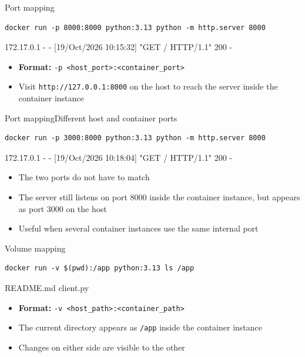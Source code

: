 \documentclass[aspectratio=169]{beamer}
\begin{document}
\begin{frame}[fragile]{Port mapping}
  \begin{verbatim}
docker run -p 8000:8000 python:3.13 python -m http.server 8000
  \end{verbatim}
  \begin{cmdoutput}
172.17.0.1 - - [19/Oct/2026 10:15:32] "GET / HTTP/1.1" 200 -
  \end{cmdoutput}

  \begin{itemize}
    \item \textbf{Format:} \texttt{-p <host\_port>:<container\_port>}
    \item Visit \texttt{http://127.0.0.1:8000} on the host to reach the server inside the container instance
  \end{itemize}

\note{
}
\end{frame}


\begin{frame}[fragile]{Port mapping}{Different host and container ports}
  \begin{verbatim}
docker run -p 3000:8000 python:3.13 python -m http.server 8000
  \end{verbatim}
  \begin{cmdoutput}
172.17.0.1 - - [19/Oct/2026 10:18:04] "GET / HTTP/1.1" 200 -
  \end{cmdoutput}

  \begin{itemize}
    \item The two ports do not have to match
    \item The server still listens on port 8000 inside the container instance, but appears as port 3000 on the host
    \item Useful when several container instances use the same internal port
  \end{itemize}

\note{
}
\end{frame}


\begin{frame}[fragile]{Volume mapping}
  \begin{verbatim}
docker run -v $(pwd):/app python:3.13 ls /app
  \end{verbatim}
  \begin{cmdoutput}
README.md
client.py
  \end{cmdoutput}

  \begin{itemize}
    \item \textbf{Format:} \texttt{-v <host\_path>:<container\_path>}
    \item The current directory appears as \texttt{/app} inside the container instance
    \item Changes on either side are visible to the other
  \end{itemize}

\note{
}
\end{frame}
\end{document}
